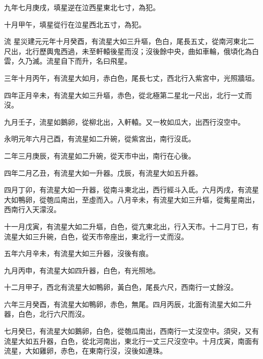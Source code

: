\begin{pinyinscope}
 九年七月庚戌，填星逆在泣西星東北七寸，為犯。



 十月甲午，填星從行在泣星西北五寸，為犯。



 流
 星災建元元年十月癸酉，有流星大如三升塸，色白，尾長五丈，從南河東北二尺出，北行歷輿鬼西過，未至軒轅後星而沒；沒後餘中央，曲如車輪，俄頃化為白雲，久乃滅。流星自下而升，名曰飛星。



 三年十月丙午，有流星大如月，赤白色，尾長七丈，西北行入紫宮中，光照牆垣。



 四年正月辛未，有流星大如三升塸，赤色，從北極第二星北一尺出，北行一丈而沒。



 九月壬子，流星如鵝卵，從柳北出，入軒轅。又一枚如瓜大，出西行沒空中。



 永明元年六月己酉，有流星如二升碗，從紫宮出，南行沒氐。



 二年三月庚辰，有流星如二升碗，從天市中出，南行在心後。



 四年二月乙丑，有流星大如一升器。戊辰，有流星大如五升器。



 四月丁卯，有流星大如一升器，從南斗東北出，西行經斗入氐。六月丙戌，有流星大如鴨卵，從匏瓜南出，至虛而入。八月辛未，有流星大如三升塸，從觜星南出，西南行入天濛沒。



 十一月戊寅，有流星大如二升塸，白色，從亢東北出，行入天市。十二月丁巳，有流星大如三升碗，白色，從天市帝座出，東北行一丈而沒。



 五年六月辛未，有流星大如三升器，沒後有痕。



 九月丙申，有流星大如四升器，白色，有光照地。



 十二月甲子，西北有流星大如鴨卵，黃白色，尾長六尺，西南行一丈餘沒。



 六年三月癸酉，有流星大如鴨卵，赤色，無尾。四月丙辰，北面有流星大如二升器，白色，北行六尺而沒。



 七月癸巳，有流星大如鵝卵，白色，從匏瓜南出，西南行一丈沒空中。須臾，又有流星大如五升器，白色，從北河南出，東北行一丈三尺沒空中。十月戊寅，南面有流星，大如雞卵，赤色，在東南行沒，沒後如連珠。




\end{pinyinscope}
